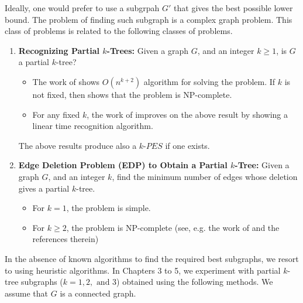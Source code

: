 Ideally, one would prefer to use a subgrpah $G'$ that gives the best possible lower bound. The problem of finding such subgraph is a complex graph problem. This class of problems is related to the following classes of problems.

\begin{enumerate}[noitemsep]
\item {\bf Recognizing  Partial $k$-Trees:} Given a graph $G$, and an integer $k\geq 1$, is $G$ a partial $k$-tree?\\
\begin{itemize}
\item The work of \cite{arnborg1987complexity} shows $O(n^{k+2})$ algorithm for solving the problem. If $k$ is not fixed, then \cite{arnborg1987complexity} shows that the problem is NP-complete.

\item For any fixed  $k$, the work of \cite{bodlaender1993linear} improves on the above result by showing a linear time recognition algorithm.
\end{itemize}
The above results produce also a $k$-$PES$ if one exists.\\

\item {\bf Edge Deletion Problem (EDP) to Obtain a Partial $k$-Tree:}  Given a graph $G$, and an integer $k$, find the minimum number of edges whose deletion gives a partial $k$-tree.
\begin{itemize}
\item For $k=1$, the problem is simple.
\item For $k\geq 2$, the problem is NP-complete (see, e.g. the work of \cite{el1988complexity} and the references therein)
\end{itemize}
\end{enumerate}

In the absence of known algorithms to find the required best subgraphs, we resort to using heuristic algorithms. In Chapters 3 to 5, we experiment with partial $k$-tree subgraphs ($k=1,2, \mbox{ and }3$) obtained using the following methods. We assume that $G$ is a connected graph.


